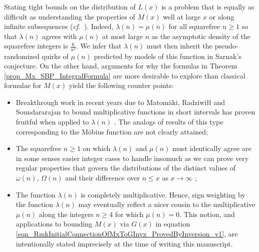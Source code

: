 \documentclass[11pt,reqno,a4letter]{article}
\newcommand{\hlocalref}[1]{\hyperref[#1]{\ref{#1}}}
\numberwithin{equation}{section}
\numberwithin{figure}{section}
\numberwithin{table}{section}
\let\citep\cite
\newcommand{\cf}{\textit{cf.\ }}
\theoremstyle{plain}
\numberwithin{theorem}{section}
\theoremstyle{definition}
\begin{document}
Stating tight bounds on the distribution of 
$L(x)$ is a problem that is equally as difficult 
as understanding the properties of $M(x)$ well at large $x$ or 
along infinite subsequences (\cf \cite{MR2877066,MR3779960,TAO-LOGAVGD-CHOWLA}). 
Indeed, $\lambda(n) = \mu(n)$ for all squarefree $n \geq 1$ so that 
$\lambda(n)$ agrees with $\mu(n)$ at most large $n$ as the asymptotic density of the 
squarefree integers is $\frac{6}{\pi^2}$. 
We infer that $\lambda(n)$ must then inherit the pseudo-randomized quirks 
of $\mu(n)$ predicted by models of this function in Sarnak's conjecture. 
On the other hand, arguments for why the formulas in 
Theorem \hlocalref{prop_Mx_SBP_IntegralFormula} are more desirable to explore than 
classical formulae for $M(x)$ yield the following counter points:
\begin{itemize}[noitemsep,topsep=0pt,leftmargin=0.23in]
\item Breakthrough work in recent years due to 
	Matom\"aki, Radziwi{\l\l} and Soundararajan to 
	bound multiplicative functions 
	in short intervals has 
	proven fruitful when applied to $\lambda(n)$ 
	\cite{SOUND-LLAMBDA-SHORT-INTS,MATRADZE-MULTFUNCS-SHORT-INTS}. 
	The analogs of results of this type corresponding 
	to the M\"obius function are not clearly attained; 
\item The squarefree $n \geq 1$ on which $\lambda(n)$ and $\mu(n)$ must identically agree 
	are in some senses easier integer cases to handle 
	insomuch as we can prove very regular properties 
	that govern the distributions of the distinct values of 
	$\omega(n)$, $\Omega(n)$ and their difference over $n \leq x$ as $x \rightarrow \infty$ 
	\citep[\cf \S 2.4; \S 7.4]{MV}; 
\item The function $\lambda(n)$ is completely 
	multiplicative. Hence, sign weighting by the function $\lambda(n)$ may eventually reflect 
	a nicer cousin to the multiplicative $\mu(n)$ along the 
	integers $n \geq 4$ for which $\mu(n) = 0$. 
	This notion, and applications to bounding $M(x)$ via $G(x)$ in 
	equation \eqref{eqn_RmkInitialConnectionOfMxToGInvx_ProvedByInversion_v1}, 
	are intentionally stated imprecisely at the time of writing this manuscript.
\end{itemize}

\renewcommand{\refname}{References} 

\end{document}
